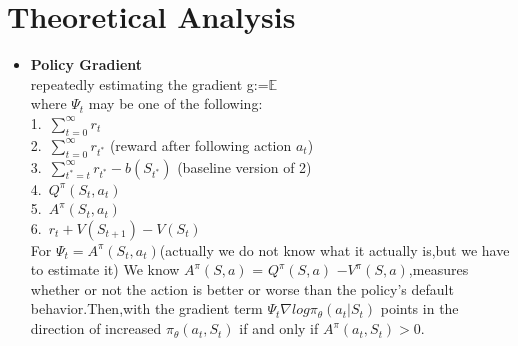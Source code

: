 \section{Theoretical Analysis}
\label{section:analysis}
\begin{itemize}
    \item\large{\bf Policy Gradient}\\
        {\hspace{1cm}repeatedly estimating the gradient 
        g:=$\mathbb{E}$\Bigg[$\sum_{t=0}^{+\infty}\Psi_t\nabla_\theta log\pi_\theta(a_t|S_t)$\Bigg]\hfill}\\
    where $\Psi_t$ may be one of the following:\\
    1.~{\large$\sum_{t=0}^{\infty}r_t$}\\
    2.~\large${\sum_{t=0}^{\infty}{r_{t^*}}}$ (reward after following action $a_t$)\\
    3.~{\large$\sum_{t^*=t}^{\infty}r_{t^*}-b(S_{t^*})$} (baseline version of 2)\\
    4.~$Q^{\pi}(S_t,a_t)$\\
    5.~$A^{\pi}(S_t,a_t)$\\
    6.~$r_t + V(S_{t+1}) - V(S_t)$\\
    For $\Psi_t = A^\pi(S_t,a_t)$(actually we do not know what it actually is,but we have to estimate it)
    We know $A^\pi(S,a)$ = $Q^\pi(S,a)$  $-V^\pi(S,a)$,measures whether or not the action is better or worse than the policy's default behavior.Then,with the gradient term $\Psi_t\nabla log\pi_{\theta}(a_t|S_t)$ points in the direction of increased $\pi_{\theta}(a_t,S_t)$ if and only if $A^{\pi}(a_t,S_t)>0$.
    

\end{itemize}
